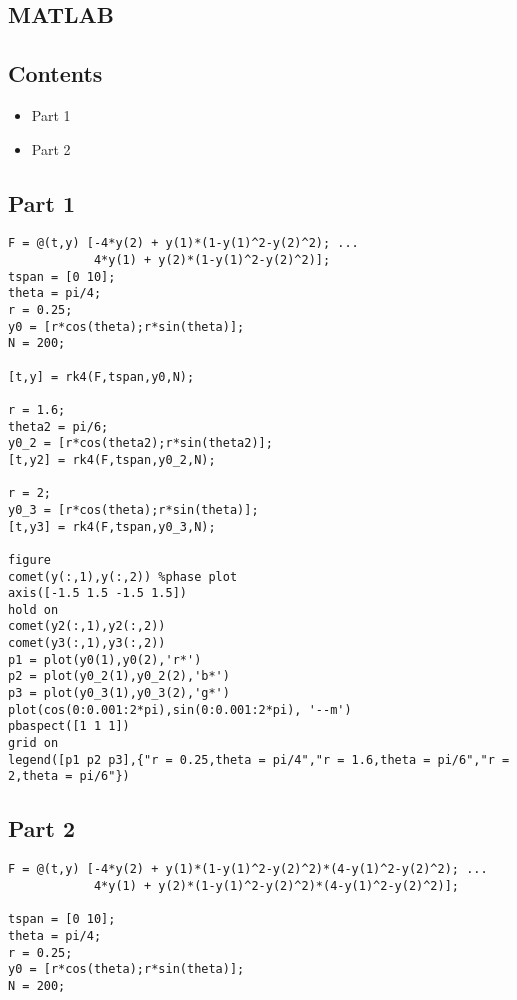 \begin{questions}
\begin{solution}
\end{solution}

\subsection*{MATLAB}

\subsection*{Contents}

\begin{itemize}
\setlength{\itemsep}{-1ex}
   \item Part 1
   \item Part 2
\end{itemize}


\subsection*{Part 1}

\begin{verbatim}
F = @(t,y) [-4*y(2) + y(1)*(1-y(1)^2-y(2)^2); ...
            4*y(1) + y(2)*(1-y(1)^2-y(2)^2)];
tspan = [0 10];
theta = pi/4;
r = 0.25;
y0 = [r*cos(theta);r*sin(theta)];
N = 200;

[t,y] = rk4(F,tspan,y0,N);

r = 1.6;
theta2 = pi/6;
y0_2 = [r*cos(theta2);r*sin(theta2)];
[t,y2] = rk4(F,tspan,y0_2,N);

r = 2;
y0_3 = [r*cos(theta);r*sin(theta)];
[t,y3] = rk4(F,tspan,y0_3,N);

figure
comet(y(:,1),y(:,2)) %phase plot
axis([-1.5 1.5 -1.5 1.5])
hold on
comet(y2(:,1),y2(:,2))
comet(y3(:,1),y3(:,2))
p1 = plot(y0(1),y0(2),'r*')
p2 = plot(y0_2(1),y0_2(2),'b*')
p3 = plot(y0_3(1),y0_3(2),'g*')
plot(cos(0:0.001:2*pi),sin(0:0.001:2*pi), '--m')
pbaspect([1 1 1])
grid on
legend([p1 p2 p3],{"r = 0.25,theta = pi/4","r = 1.6,theta = pi/6","r = 2,theta = pi/6"})
\end{verbatim}


\subsection*{Part 2}

\begin{verbatim}
F = @(t,y) [-4*y(2) + y(1)*(1-y(1)^2-y(2)^2)*(4-y(1)^2-y(2)^2); ...
            4*y(1) + y(2)*(1-y(1)^2-y(2)^2)*(4-y(1)^2-y(2)^2)];

tspan = [0 10];
theta = pi/4;
r = 0.25;
y0 = [r*cos(theta);r*sin(theta)];
N = 200;


\end{verbatim}
\end{questions}
